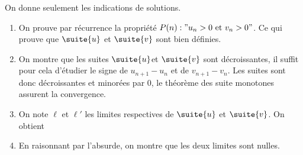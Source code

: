 \begin{correction}
On donne seulement les indications de solutions. 
	\begin{enumerate}
		\item On prouve par récurrence la propriété $P(n): " u_n>0 \text{ et } v_n>0"$. Ce qui prouve que $\suite{u}$ et $\suite{v}$ sont bien définies. 
		\item On montre  que les suites $\suite{u}$et $\suite{v}$ sont  décroissantes, il suffit pour cela d'étudier le signe de $u_{n+1}-u_n$  et de $v_{n+1}-v_n$. Les suites sont donc décroissantes et minorées par 0, le théorème  des suite monotones assurent la convergence. 
		\item On note $\ell$ et $\ell'$ les limites respectives de $\suite{u}$ et $\suite{v} $. On obtient 
		\item En raisonnant par l'absurde, on montre que les deux limites sont nulles. 

	\end{enumerate}
\end{correction}